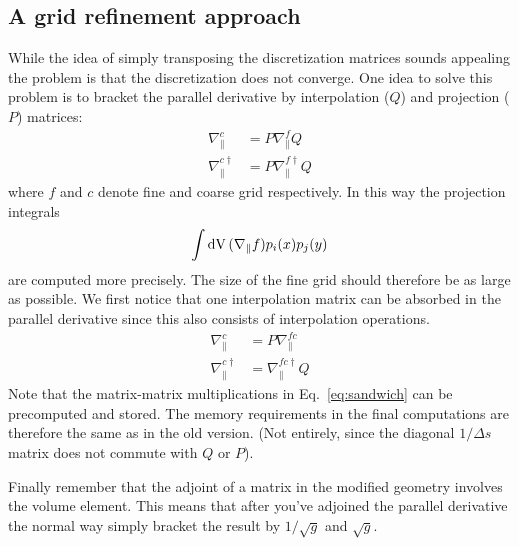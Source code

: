 \subsection{A grid refinement approach}
While the idea of simply transposing the discretization matrices sounds appealing the problem
is that the discretization does not converge.
One idea to solve this problem \cite{Stegmeir2017} is
to bracket the parallel derivative by interpolation ($Q$) and
projection ($P$) matrices:
\begin{align}
    \nabla^c_\parallel &= P\nabla_\parallel^f Q \\
    \nabla^{c\dagger}_\parallel &= P \nabla^{f\dagger}_\parallel Q
    \label{eq:sandwich}
\end{align}
where $f$ and $c$ denote fine and coarse grid respectively.
In this way the projection integrals
\begin{align*}
    \int\mathrm{dV}\, (\nabla_\parallel f) p_i(x)p_j(y)
    \label{}
\end{align*}
are computed more precisely.
The size of the fine grid should therefore be as large as
possible.
We first notice that one interpolation matrix can be absorbed
in the parallel derivative since this also consists of
interpolation operations.
\begin{align}
    \nabla^c_\parallel &= P\nabla_\parallel^{fc} \\
    \nabla^{c\dagger}_\parallel &= \nabla^{fc\dagger}_\parallel Q
    \label{eq:sandwich}
\end{align}
Note that the matrix-matrix multiplications in Eq.~\eqref{eq:sandwich} can
be precomputed and stored. The memory requirements
in the final computations are
therefore the same  as in the old version. (Not entirely, since
the diagonal $1/\Delta s$ matrix does not commute with $Q$ or $P$).

Finally remember that the adjoint of a matrix in the modified geometry
involves the volume element. This means that after you've adjoined the
parallel derivative the normal way simply bracket the result
by $1/\sqrt{g}$ and $\sqrt{g}$.



